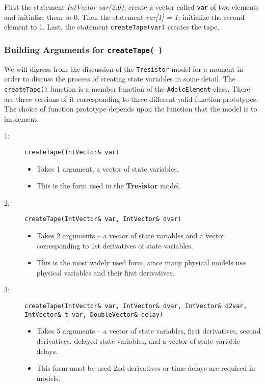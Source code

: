 First the statement \textit{IntVector var(2,0);} create a vector
called \texttt{var} of two elements and initialize them to 0. Then
the statement \textit{var[1] = 1;} initialize the second element
to 1. Last, the statement \texttt{createTape(var)} creates the
tape.

\subsubsection{Building Arguments for \texttt{createTape(~)}}
We will digress from the discussion of the \texttt{Tresistor}
model for a moment in order to discuss the process of creating
state variables in some detail.  The \texttt{createTape()}
function is a member function of the \texttt{AdolcElement}
class. There are three versions of it corresponding to three
different valid function prototypes.  The choice of function
prototype depends upon the function that the model is to implement.

\begin{description}
    \item[1:]\texttt{{createTape(IntVector\& var)}}
    \begin{itemize}
        \item Takes 1 argument, a vector of state variables.
        \item This is the form used in the \textbf{Tresistor} model.
    \end{itemize}
    \item[2:]\texttt{{createTape(IntVector\& var, IntVector\& dvar)}}
    \begin{itemize}
        \item Takes 2 arguments -- a vector of state variables
        and a vector corresponding to 1st derivatives of state
        variables.
        \item This is the most widely used form, since many physical
        models use physical variables and their first derivatives.
    \end{itemize}
    \item[3:]\texttt{{createTape(IntVector\& var, IntVector\& dvar, IntVector\& d2var, \\
        IntVector\& t\_var, DoubleVector\& delay)}}
    \begin{itemize}
        \item Takes 5 arguments -- a vector of state variables,
        first derivatives, second derivatives, delayed state
        variables, and a vector of state variable delays.
        \item This form must be used 2nd derivatives or time delays
        are required in models.
    \end{itemize}
\end{description}

